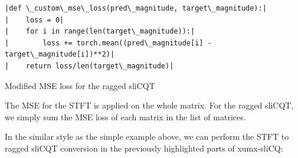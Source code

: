 \documentclass[report.tex]{subfiles}
\begin{document}
\begin{listing}[h]
  \centering
\begin{verbatim}
|def \_custom\_mse\_loss(pred\_magnitude, target\_magnitude):|
|    loss = 0|
|    for i in range(len(target\_magnitude)):|
|        loss += torch.mean((pred\_magnitude[i] - target\_magnitude[i])**2)|
|    return loss/len(target\_magnitude)|
\end{verbatim}
  \caption{Modified MSE loss for the ragged sliCQT}
  \label{code:simplemse}
\end{listing}

The MSE for the STFT is applied on the whole matrix. For the ragged sliCQT, we simply sum the MSE loss of each matrix in the list of matrices.

In the similar style as the simple example above, we can perform the STFT to ragged sliCQT conversion in the previously highlighted parts of xumx-sliCQ:
\end{document}
